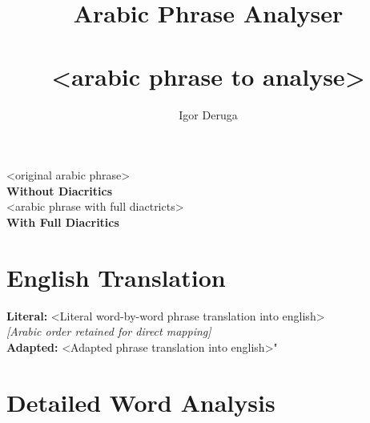 \documentclass[letter,12pt]{article}
\begin{document}
\title{\textbf{\Large Arabic Phrase Analyser}\\
\\
\normalsize \textarabic{<arabic phrase to analyse>}}
\author{Igor Deruga}
\date{}
\maketitle

\begin{tcolorbox}[colback=boxcolor,colframe=headercolor,title=\textbf{Arabic Phrase}]
\centering
\textarabic{<original arabic phrase>}
\\[0.5em]
\textbf{Without Diacritics}
\\[1em]
\textarabic{<arabic phrase with full diactricts>}
\\[0.5em]
\textbf{With Full Diacritics}
\end{tcolorbox}

\section{English Translation}
\begin{tcolorbox}[colback=white,colframe=accentcolor]
\textbf{Literal:} <Literal word-by-word phrase translation into english> \\
\textit{[Arabic order retained for direct mapping]}\\[0.5em]
\textbf{Adapted:} <Adapted phrase translation into english>"
\end{tcolorbox}

\section{Detailed Word Analysis}
\end{document}
